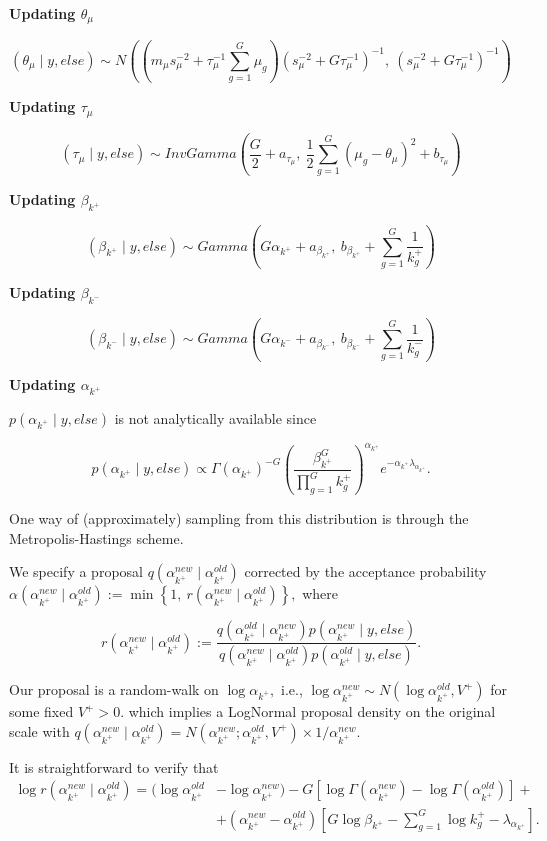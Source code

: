\textbf{Updating $\theta_{\mu}$}

$$(\theta_{\mu} \mid y, else) \sim N \left( \left(m_{\mu}s^{-2}_{\mu} + \tau^{-1}_{\mu}\sum^G_{g=1} \mu_g\right)(s^{-2}_{\mu} + G\tau^{-1}_{\mu})^{-1}, \ (s^{-2}_{\mu} + G\tau^{-1}_{\mu})^{-1}\right)$$

\textbf{Updating $\tau_{\mu}$}

$$(\tau_{\mu} \mid y, else) \sim InvGamma \left( \frac{G}{2} + a_{\tau_{\mu}}, \ \frac{1}{2} \sum^G_{g=1}(\mu_g - \theta_{\mu})^2 + b_{\tau_{\mu}}\right)$$

\textbf{Updating $\beta_{k^+}$}

$$ (\beta_{k^+} \mid y, else) \sim Gamma\left(G \alpha_{k^+} + a_{\beta_{k^+}}, \ b_{\beta_{k^+}} + \sum^G_{g=1}\frac{1}{k^+_g}\right)$$

\textbf{Updating $\beta_{k^-}$}

$$ (\beta_{k^-} \mid y, else) \sim Gamma\left(G \alpha_{k^-} + a_{\beta_{k^-}}, \ b_{\beta_{k^-}} + \sum^G_{g=1}\frac{1}{k^-_g}\right)$$

\textbf{Updating $\alpha_{k^+}$}

$p(\alpha_{k^+} \mid y, else)$ is not analytically available since

$$p(\alpha_{k^+} \mid y, else) \propto \Gamma(\alpha_{k^+})^{-G} \left( \frac{\beta^G_{k^+}}{ \prod^G_{g=1}k^+_g}\right)^{\alpha_{k^+}}e^{-\alpha_{k^+}\lambda_{\alpha_{k^+}}}.$$

One way of (approximately) sampling from this distribution is through the Metropolis-Hastings scheme. 

We specify a proposal $q(\alpha^{new}_{k^+} \mid \alpha^{old}_{k^+})$ corrected by the acceptance probability $\alpha(\alpha^{new}_{k^+} \mid \alpha^{old}_{k^+}):=\min\left\{1, \  r(\alpha^{new}_{k^+} \mid \alpha^{old}_{k^+}) \right\},$ where

$$r(\alpha^{new}_{k^+} \mid \alpha^{old}_{k^+}) := \frac{q(\alpha^{old}_{k^+} \mid \alpha^{new}_{k^+})p(\alpha^{new}_{k^+} \mid y, else)}{q(\alpha^{new}_{k^+} \mid \alpha^{old}_{k^+})p(\alpha^{old}_{k^+} \mid y, else)}.$$

Our proposal is a random-walk on $\log \alpha_{k^+},$ i.e., $\log \alpha^{new}_{k^+} \sim N(\log\alpha^{old}_{k^+}, V^+)$ for some fixed $V^+>0$. which implies a LogNormal proposal density on the original scale with $q(\alpha^{new}_{k^+} \mid \alpha^{old}_{k^+}) = N(\alpha^{new}_{k^+}; \alpha^{old}_{k^+}, V^+)\times 1/\alpha^{new}_{k^+}$.

It is straightforward to verify that
\begin{align*}
\log r(\alpha^{new}_{k^+} \mid \alpha^{old}_{k^+}) = (\log \alpha^{old}_{k^+} &- \log \alpha^{new}_{k^+}) - G\left[ \log \Gamma(\alpha^{new}_{k^+}) - \log \Gamma(\alpha^{old}_{k^+}) \right] + \\
&+(\alpha^{new}_{k^+} - \alpha^{old}_{k^+}) \left[  G \log \beta_{k^+} - \sum^G_{g=1} \log k^+_g - \lambda_{\alpha_{k^+}}\right].
\end{align*}

